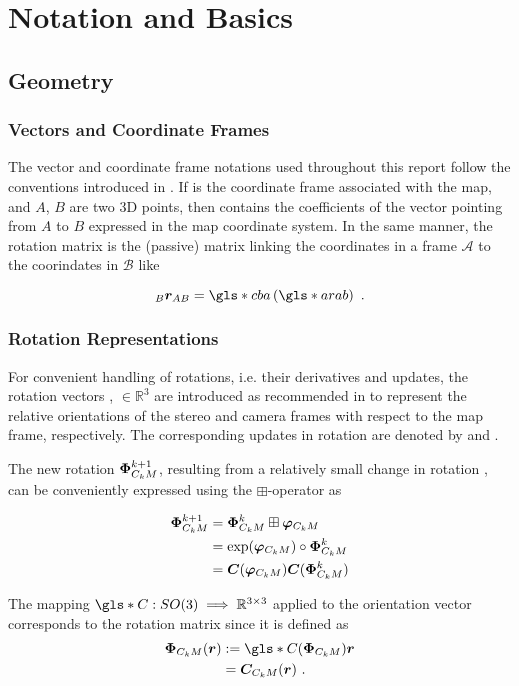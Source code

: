 \chapter{Notation and Basics}
\section{Geometry}
\subsection{Vectors and Coordinate Frames}

The vector and coordinate frame notations used throughout this report follow the
conventions introduced in \cite{coordinates}.
If  is the coordinate frame associated with the map, and $A$, $B$ are two 
3D points, then  contains the coefficients of the vector pointing from $A$ to $B$ expressed in the map coordinate system.
In the same manner, the rotation matrix  is the (passive) matrix linking
the coordinates in a frame $\mathcal{A}$ to the coorindates in $\mathcal{B}$ like

\begin{equation}
  \brab = \g{cba} \left( \g{arab} \right) \text{ .}
\end{equation}

\subsection{Rotation Representations}

For convenient handling of rotations, i.e. their derivatives and updates, the
rotation vectors \Phic, \Phis $\in\mathbb{R}^3$ are introduced as recommended in 
\cite{Primer} to represent the relative orientations of the stereo and camera
frames with respect to the map frame, respectively. The corresponding updates in
rotation are denoted by \phic and \phis.

The new rotation $\bm{\Phi}_{C_kM}^{k+1}$, resulting from a relatively small change in
rotation \phic, can be conveniently expressed using the $\boxplus$-operator as

\begin{align}
  \bm{\Phi}_{C_kM}^{k+1} &= \bm{\Phi}_{C_kM}^k \boxplus \bm{\varphi}_{C_kM} \\
  &= \text{exp}(\bm{\varphi}_{C_kM}) \circ \bm{\Phi}_{C_kM}^k \\
  &= \bm{C}(\bm{\varphi}_{C_kM}) \bm{C}(\bm{\Phi}_{C_kM}^k)  
\end{align}

The mapping $\g{C} : SO(3) \implies \mathbb{R}^{3\times3}$ applied to the
orientation vector \Phic corresponds to the rotation matrix \rotcm since it is
defined as
\begin{align}
  \Phic(\vc{r}) &:= \g{C}(\Phic)\vc{r} \\
  &= \rotcm(\vc{r})
  \label{eq:basics-rotation} \text{ .}
\end{align}

